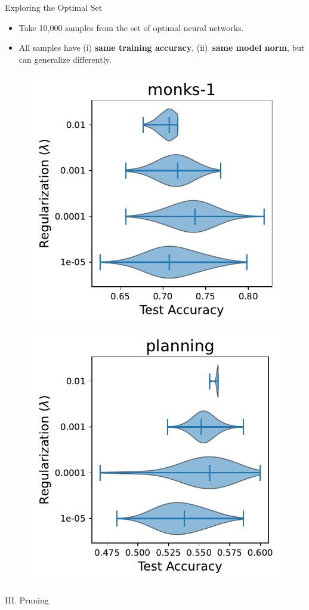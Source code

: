 \documentclass[usenames,dvipsnames,mathserif,notheorems]{beamer}
\begin{document}
\begin{frame}{Exploring the Optimal Set}
	\begin{itemize}
		\item Take 10,000 samples from the set of optimal neural networks.
		      \pause
		\item All samples have (i) \textbf{same training accuracy},
		      (ii)~\textbf{same model norm}, but can generalize differently.
		      \pause
	\end{itemize}

	\begin{figure}[t]
		\centering
		\includegraphics[width=0.48\linewidth]{assets/dist_paper_monks-1.pdf}
		\includegraphics[width=0.48\linewidth]{assets/dist_paper_planning.pdf}
	\end{figure}
\end{frame}



\begin{frame}{}
	\begin{center}
		\huge III. Pruning
	\end{center}
\end{frame}
\end{document}

